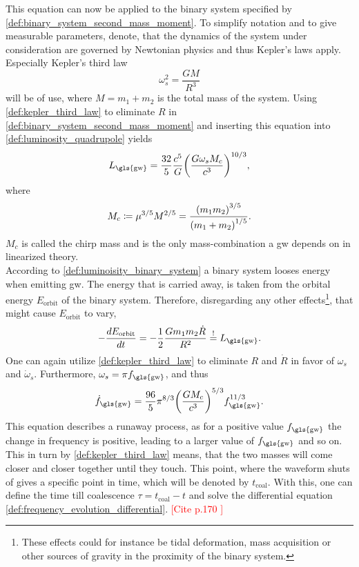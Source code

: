 This equation can now be applied to the binary system specified by \eqref{def:binary_system_second_mass_moment}. To simplify notation and to give measurable parameters, denote, that the dynamics of the system under consideration are governed by Newtonian physics and thus Kepler's laws apply. Especially Kepler's third law
\begin{equation}\label{def:kepler_third_law}
\omega_s^2=\frac{G M}{R^3}
\end{equation}
will be of use, where $M=m_1+m_2$ is the total mass of the system. Using \eqref{def:kepler_third_law} to eliminate $R$ in \eqref{def:binary_system_second_mass_moment} and inserting this equation into \eqref{def:luminosity_quadrupole} yields
\begin{equation}\label{def:luminoisity_binary_system}
L_\text{\gls{gw}}=\frac{32}{5}\frac{c^5}{G}\lr{\frac{G\omega_s M_c}{c^3}}^{10/3},
\end{equation}
where
\begin{equation}
M_c\coloneqq \mu^{3/5}M^{2/5}=\frac{{\left( m_1 m_2 \right)}^{3/5}}{{\left( m_1 + m_2 \right)}^{1/5}}.
\end{equation}
$M_c$ is called the chirp mass and is the only mass-combination a \gls{gw} depends on in linearized theory.\medskip\\
According to \eqref{def:luminoisity_binary_system} a binary system looses energy when emitting \gls{gw}. The energy that is carried away, is taken from the orbital energy $E_\text{orbit}$ of the binary system. Therefore, disregarding any other effects\footnote{These effects could for instance be tidal deformation, mass acquisition or other sources of gravity in the proximity of the binary system.}, that might cause $E_\text{orbit}$ to vary,
\begin{equation}
-\frac{d E_\text{orbit}}{dt}=-\frac{1}{2}\frac{G m_1 m_2 \dot{R}}{R^2}\mbe L_\text{\gls{gw}}.
\end{equation}
One can again utilize \eqref{def:kepler_third_law} to eliminate $R$ and $\dot{R}$ in favor of $\omega_s$ and $\dot{\omega}_s$. Furthermore, $\omega_s = \pi f_\text{\gls{gw}}$, and thus
\begin{equation}\label{def:frequency_evolution_differential}
\dot{f}_\text{\gls{gw}}=\frac{96}{5}\pi^{8/3}\lr{\frac{G M_c}{c^3}}^{5/3}f_\text{\gls{gw}}^{11/3}.
\end{equation}
This equation describes a runaway process, as for a positive value $f_\text{\gls{gw}}$ the change in frequency is positive, leading to a larger value of $f_\text{\gls{gw}}$ and so on. This in turn by \eqref{def:kepler_third_law} means, that the two masses will come closer and closer together until they touch. This point, where the waveform shuts of gives a specific point in time, which will be denoted by $t_\text{coal}$. With this, one can define the time till coalescence $\tau=t_\text{coal}-t$ and solve the differential equation \eqref{def:frequency_evolution_differential}. \textcolor{red}{[Cite p.170 \cite{gwv1}]}
